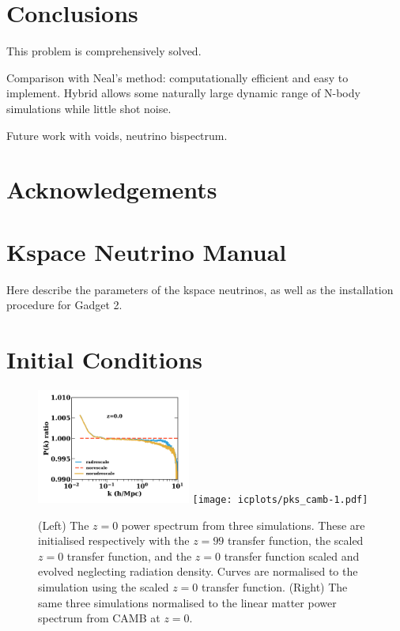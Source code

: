 \documentclass[useAMS, usenatbib]{mnras}
\begin{document}
\section{Conclusions}
\label{sec:conclusion}

This problem is comprehensively solved.

Comparison with Neal's method:
computationally efficient and easy to implement.
Hybrid allows some naturally large dynamic range of N-body simulations while little shot noise.

Future work with voids, neutrino bispectrum.

\section*{Acknowledgements}

\appendix

\section{Kspace Neutrino Manual}
\label{sec:manual}

Here describe the parameters of the kspace neutrinos,
as well as the installation procedure for Gadget 2.

\section{Initial Conditions}
\label{sec:initcond}

\begin{figure}
\includegraphics[width=0.45\textwidth]{icplots/pks_rel-1.pdf}
\texttt{[image: icplots/pks\_camb-1.pdf]}
  \caption{(Left) The $z=0$ power spectrum from three simulations.
  These are initialised respectively with the $z=99$ transfer function,
  the scaled $z=0$ transfer function, and the $z=0$ transfer function
  scaled and evolved neglecting radiation density.
  Curves are normalised to the simulation using the scaled $z=0$ transfer function.
  (Right) The same three simulations normalised to the linear matter
  power spectrum from CAMB at $z=0$.}
  \label{fig:rescaling0}
\end{figure}
\end{document}
